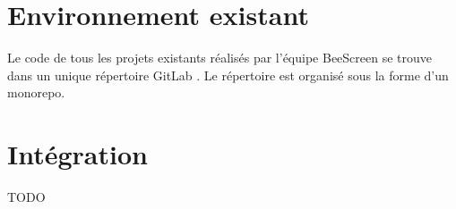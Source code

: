 \section{Environnement existant}

Le code de tous les projets existants réalisés par l'équipe BeeScreen se trouve dans un unique répertoire GitLab \cite{beescreens}. Le répertoire est organisé sous la forme d'un monorepo.

\section{Intégration}

TODO